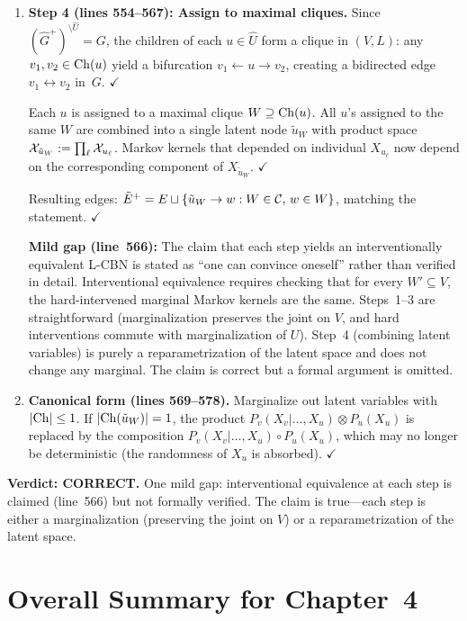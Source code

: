 \documentclass{article}
\begin{document}
\begin{enumerate}[leftmargin=*]
  \item \textbf{Step 4 (lines 554--567): Assign to maximal cliques.}
    Since $(\hat G^+)^{\setminus\hat U}=G$, the children of each $u\in\hat U$
    form a clique in $(V,L)$: any $v_1,v_2\in\mathrm{Ch}(u)$ yield a bifurcation
    $v_1\leftarrow u\to v_2$, creating a bidirected edge $v_1\leftrightarrow v_2$
    in~$G$.  $\checkmark$

    Each $u$ is assigned to a maximal clique $W\supseteq\mathrm{Ch}(u)$.
    All $u$'s assigned to the same $W$ are combined into a single latent node
    $\tilde u_W$ with product space
    $\mathcal{X}_{\tilde u_W}:=\prod_\ell\mathcal{X}_{u_\ell}$.
    Markov kernels that depended on individual $X_{u_\ell}$ now depend on the
    corresponding component of $X_{\tilde u_W}$.  $\checkmark$

    Resulting edges: $\tilde E^+ = E \sqcup \{\tilde u_W\to w : W\in\mathcal{C},\,w\in W\}$,
    matching the statement.  $\checkmark$

    \textbf{Mild gap (line~566):} The claim that each step yields an
    interventionally equivalent L-CBN is stated as ``one can convince oneself''
    rather than verified in detail.  Interventional equivalence requires checking
    that for every $W'\subseteq V$, the hard-intervened marginal Markov kernels
    are the same.  Steps~1--3 are straightforward (marginalization preserves the
    joint on $V$, and hard interventions commute with marginalization of $U$).
    Step~4 (combining latent variables) is purely a reparametrization of the
    latent space and does not change any marginal.  The claim is correct but
    a formal argument is omitted.

  \item \textbf{Canonical form (lines 569--578).}
    Marginalize out latent variables with $|\mathrm{Ch}|\le 1$.
    If $|\mathrm{Ch}(\tilde u_W)|=1$, the product
    $P_v(X_v|\ldots,X_u)\otimes P_u(X_u)$
    is replaced by the composition $P_v(X_v|\ldots,X_u)\circ P_u(X_u)$,
    which may no longer be deterministic (the randomness of $X_u$ is absorbed).
    $\checkmark$
\end{enumerate}

\textbf{Verdict: CORRECT.}  One mild gap: interventional equivalence at each
step is claimed (line~566) but not formally verified.  The claim is true---each
step is either a marginalization (preserving the joint on $V$) or a
reparametrization of the latent space.

\section*{Overall Summary for Chapter~4}
\end{document}
